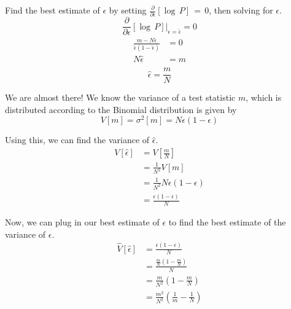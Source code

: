 \documentclass[12]{article}
\begin{document}
Find the best estimate of $\epsilon$ by setting $\frac{\partial}{\partial \epsilon} \left[ \log \, P \right] \, = \, 0$, then solving for $\epsilon$.
\begin{equation}
  \frac{\partial}{\partial \epsilon} \left[ \log \, P \right] \Bigr\rvert_{\epsilon = \hat{\epsilon}}
    = 0
\end{equation}
\begin{subequations}
  \begin{align}
    \frac{m - N\hat{\epsilon}}{\hat{\epsilon}\left(1-\hat{\epsilon}\right)} & = 0 \\
    N\hat{\epsilon} & = m \\
  \end{align}
\end{subequations}
\begin{equation}
  \boxed{
  \hat{\epsilon} = \frac{m}{N}
  }
\end{equation}

We are almost there! We know the variance of a test statistic $m$, which is distributed according to the Binomial distribution is given by
\begin{equation}
    V\left[m\right] = \sigma^2\left[m\right] = N\epsilon\left(1-\epsilon\right)
\end{equation}

Using this, we can find the variance of $\hat{\epsilon}$.
\begin{subequations}
  \begin{align}
    V \left[ \hat{\epsilon} \right]
    & = V\left[\frac{m}{N}\right] \\
    & = \frac{1}{N^2} V\left[m\right] \\
    & = \frac{1}{N^2} N\epsilon\left(1-\epsilon\right) \\
    & = \frac{\epsilon\left(1-\epsilon\right)}{N}
  \end{align}
\end{subequations}

Now, we can plug in our best estimate of $\epsilon$ to find the best estimate of the variance of $\epsilon$.
\begin{subequations}
  \begin{align}
    \hat{V} \left[ \hat{\epsilon} \right]
    & = \frac{\epsilon\left(1-\epsilon\right)}{N} \\
    & = \frac{\frac{m}{N}\left(1-\frac{m}{N}\right)}{N} \\
    & = \frac{m}{N^2}\left(1 - \frac{m}{N}\right) \\
    & = \frac{m^2}{N^2}\left(\frac{1}{m}-\frac{1}{N}\right) \\
  \end{align}
\end{subequations}
\end{document}

